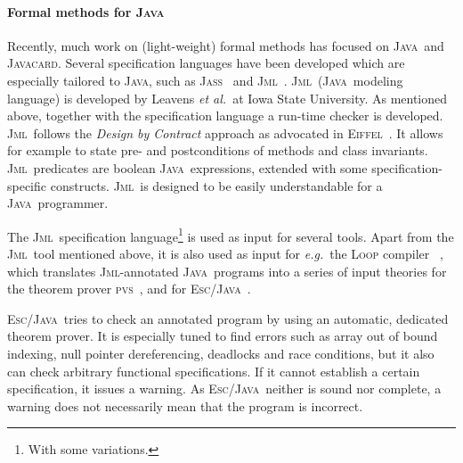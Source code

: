 \documentclass[a4paper]{llncs}
\newcommand{\jml}{\textsc{Jml}}
\newcommand{\escj}{\textsc{Esc/Java}}
\newcommand{\eiffel}{\textsc{Eiffel}}
\newcommand{\jass}{\textsc{Jass}}
\newcommand{\java}{\textsc{Java}}
\newcommand{\cPP}{\texttt{C/C}\nolinebreak\hspace{-.05em}\raisebox{.4ex}{\tiny\bf
+}\nolinebreak\hspace{-.10em}\raisebox{.4ex}{\tiny\bf +}}
\begin{document}
\paragraph{\bf{Formal methods for \java}}
Recently, much work on (light-weight) formal methods has focused on
\java\ and \textsc{Javacard}. Several specification languages have
been developed which are especially tailored to \java, such as
\jass~\cite{bartetzko01assertions} and \jml~\cite{LeavensBR00}.
\jml\ (\java\ modeling language) is developed by Leavens \emph{et 
al.}~at Iowa State University. As mentioned above, together with the
specification language a run-time checker is developed. \jml\ follows
the \emph{Design by Contract} approach as advocated in
\eiffel~\cite{Meyer97}. It allows for example to state pre- and
postconditions of methods and class invariants. \jml\ predicates are
boolean \java\ expressions, extended with some specification-specific
constructs. \jml\ is designed to be easily understandable for a \java\
programmer.

The \jml\ specification language\footnote{With some variations.} is
used as input for several tools. Apart from the \jml\ tool mentioned
above, it is also used as input for \emph{e.g.}~the
\textsc{Loop} compiler~\cite{LoopURL,BergJ01} , which translates
\jml-annotated \java\ programs into a series of input theories for the 
theorem prover \textsc{pvs}~\cite{OwreRRSS96}, and for
\escj~\cite{ESCJavaUrl,EscJmlDiff}. 

\escj\ tries to check an annotated program by
using an automatic, dedicated theorem prover. It is especially tuned
to find errors such as array out of bound indexing, null pointer
dereferencing, deadlocks and race conditions, but it also can check
arbitrary functional specifications. If it cannot establish a certain
specification, it issues a warning. As \escj\ neither is sound nor
complete, a warning does not necessarily mean that the program is
incorrect.

\end{document}
